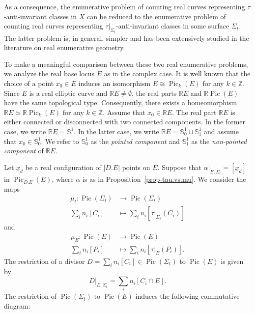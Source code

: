 \documentclass[10pt,a4paper]{article}
\numberwithin{equation}{section}
\theoremstyle{definition}
\theoremstyle{plain}
\theoremstyle{remark}
\newcommand{\R}{\mathbb{R}}
\DeclareMathOperator{\Pic}{Pic}
\newcommand{\lra}{\longrightarrow}
\begin{document}
As a consequence, the enumerative problem of counting real curves representing $\tau$-anti-invariant classes in $X$ can be reduced to the enumerative problem of counting real curves representing $\tau|_{\Sigma_t}$-anti-invariant  classes in some surface $\Sigma_t$. The latter problem is, in general, simpler and has been extensively studied in the literature on real enumerative geometry.

To make a meaningful comparison between these two real enumerative problems, we analyze the real base locus $E$ as in the complex case. It is well known that the choice of a point $x_0\in E$ induces an isomorphism $E\cong \Pic_k(E)$  for any $k\in \mathbb{Z}$. Since $E$ is a real elliptic curve and $\R E\neq \emptyset$, the real parts  $\R E$ and $\R \Pic (E)$ have the same topological type. Consequently, there exists a homeomorphism $\R E \simeq \R \Pic_k(E)$ for any $k\in \mathbb{Z}$. Assume that $x_0\in \R E$. The real part $\R E$ is either connected or disconnected with two connected components. In the former case, we write $\mathbb{R} E =\mathbb{S}^1$. In the latter case, we write $\mathbb{R} E =\mathbb{S}^1_0\sqcup \mathbb{S}^1_1$ and assume that $x_0\in\mathbb{S}^1_0$. We refer to $\mathbb{S}^1_0$ as the \textit{pointed component} and $\mathbb{S}^1_1$ as the \textit{non-pointed component} of $\R E$.

 
 

Let $\underline{x}_{d}$ be a real configuration of $|D.E|$ points on $E$. Suppose that $\alpha|_{E,\Sigma_t}=[\underline{x}_{d}]$ in $\Pic_{D.E}(E)$, where $\alpha$ is as in Proposition~\ref{prop-tau.vs.mu}. 
We consider the  maps
    \begin{align*}
    \mu_t\colon \Pic(\Sigma_t)&\lra \Pic(\Sigma_t)\\
    \sum_i n_i [C_i]&\longmapsto \sum_i n_i \left[\tau|_{\Sigma_t}(C_i)\right]
\end{align*}
and
\begin{align*}
    \mu_E\colon \Pic(E)&\lra \Pic(E)\\
    \sum_i n_i [P_i]&\longmapsto \sum_i n_i \left[\tau|_{E}(P_i)\right].
\end{align*}
The restriction of a divisor $D=\sum_i n_i [C_i]\in \Pic(\Sigma_t)$ to $\Pic(E)$ is given by $$D|_{E,\Sigma_t}=\sum_i n_i [C_i\cap E].$$ 
The restriction of $\Pic(\Sigma_t)$ to $\Pic(E)$ induces the following commutative diagram:
 \begin{center}
        \end{center}
 
\end{document}
